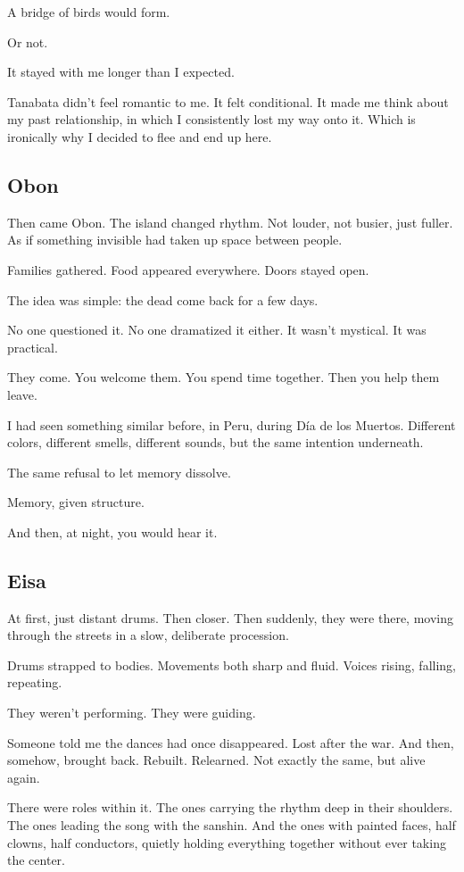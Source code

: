 \documentclass[
  letterpaper,
  oneside]{scrbook}
\begin{document}
A bridge of birds would form.

Or not.

It stayed with me longer than I expected.

Tanabata didn't feel romantic to me. It felt conditional. It made me
think about my past relationship, in which I consistently lost my way
onto it. Which is ironically why I decided to flee and end up here.

\subsection{Obon}\label{obon}

Then came Obon. The island changed rhythm. Not louder, not busier, just
fuller. As if something invisible had taken up space between people.

Families gathered. Food appeared everywhere. Doors stayed open.

The idea was simple: the dead come back for a few days.

No one questioned it. No one dramatized it either. It wasn't mystical.
It was practical.

They come. You welcome them. You spend time together. Then you help them
leave.

I had seen something similar before, in Peru, during Día de los Muertos.
Different colors, different smells, different sounds, but the same
intention underneath.

The same refusal to let memory dissolve.

Memory, given structure.

And then, at night, you would hear it.

\subsection{Eisa}\label{eisa}

At first, just distant drums. Then closer. Then suddenly, they were
there, moving through the streets in a slow, deliberate procession.

Drums strapped to bodies. Movements both sharp and fluid. Voices rising,
falling, repeating.

They weren't performing. They were guiding.

Someone told me the dances had once disappeared. Lost after the war. And
then, somehow, brought back. Rebuilt. Relearned. Not exactly the same,
but alive again.

There were roles within it. The ones carrying the rhythm deep in their
shoulders. The ones leading the song with the sanshin. And the ones with
painted faces, half clowns, half conductors, quietly holding everything
together without ever taking the center.
\end{document}
